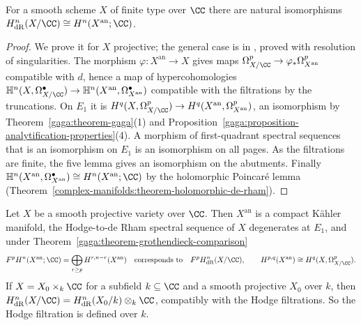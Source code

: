\begin{theorem}[Grothendieck]\label{gaga:theorem-grothendieck-comparison}
For a smooth scheme $X$ of finite type over $\CC$ there are natural isomorphisms $H^n_{\mathrm{dR}}(X/\CC) \cong H^n(X^{\mathrm{an}}; \CC)$.
\end{theorem}

\begin{proof}
We prove it for $X$ projective; the general case is in \cite{grothendieck-de-rham}, proved with resolution of singularities. The morphism
$\varphi \colon X^{\mathrm{an}} \to X$ gives maps $\Omega^p_{X/\CC} \to \varphi_*\Omega^p_{X^{\mathrm{an}}}$ compatible with $d$, hence a map of hypercohomologies
$\mathbb{H}^n(X, \Omega^\bullet_{X/\CC}) \to \mathbb{H}^n(X^{\mathrm{an}}, \Omega^\bullet_{X^{\mathrm{an}}})$ compatible with the filtrations by the truncations. On $E_1$ it is
$H^q(X, \Omega^p_{X/\CC}) \to H^q(X^{\mathrm{an}}, \Omega^p_{X^{\mathrm{an}}})$, an isomorphism by Theorem~\ref{gaga:theorem-gaga}(1) and
Proposition~\ref{gaga:proposition-analytification-properties}(4). A morphism of first-quadrant spectral sequences that is an isomorphism on $E_1$ is an isomorphism on
all pages. As the filtrations are finite, the five lemma gives an isomorphism on the abutments. Finally
$\mathbb{H}^n(X^{\mathrm{an}}, \Omega^\bullet_{X^{\mathrm{an}}}) \cong H^n(X^{\mathrm{an}}; \CC)$ by the holomorphic Poincar\'e lemma
(Theorem~\ref{complex-manifolds:theorem-holomorphic-de-rham}).
\end{proof}

\begin{corollary}\label{gaga:corollary-algebraic-hodge}
Let $X$ be a smooth projective variety over $\CC$. Then $X^{\mathrm{an}}$ is a compact K\"ahler manifold, the Hodge-to-de Rham spectral sequence of $X$ degenerates at $E_1$,
and under Theorem~\ref{gaga:theorem-grothendieck-comparison}
\[
F^pH^n(X^{\mathrm{an}}; \CC) = \bigoplus_{r \geq p}H^{r,n-r}(X^{\mathrm{an}}) \quad\text{corresponds to}\quad F^pH^n_{\mathrm{dR}}(X/\CC), \qquad H^{p,q}(X^{\mathrm{an}}) \cong H^q(X, \Omega^p_{X/\CC}).
\]
If $X = X_0 \times_k\CC$ for a subfield $k \subseteq \CC$ and a smooth projective $X_0$ over $k$, then $H^n_{\mathrm{dR}}(X/\CC) = H^n_{\mathrm{dR}}(X_0/k) \otimes_k\CC$, compatibly
with the Hodge filtrations. So the Hodge filtration is defined over $k$.
\end{corollary}

